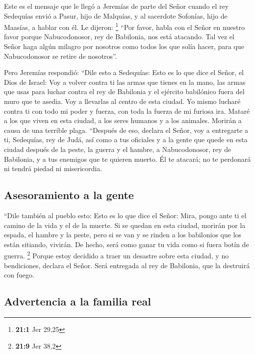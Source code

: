  Este es el mensaje que le llegó a Jeremías de parte del
Señor cuando el rey Sedequías envió a Pasur, hijo de Malquías, y al
sacerdote Sofonías, hijo de Maasías, a hablar con él. Le dijeron:
\footnote{\textbf{21:1} Jer 29,25}  ``Por favor, habla con
el Señor en nuestro favor porque Nabucodonosor, rey de Babilonia, nos
está atacando. Tal vez el Señor haga algún milagro por nosotros como
todos los que solía hacer, para que Nabucodonosor se retire de
nosotros''.

 Pero Jeremías respondió: ``Dile esto a Sedequías:
 Esto es lo que dice el Señor, el Dios de Israel: Voy a
volver contra ti las armas que tienes en la mano, las armas que usas
para luchar contra el rey de Babilonia y el ejército babilónico fuera
del muro que te asedia. Voy a llevarlas al centro de esta ciudad.
 Yo mismo lucharé contra ti con todo mi poder y fuerza,
con toda la fuerza de mi furiosa ira.  Mataré a los que
viven en esta ciudad, a los seres humanos y a los animales. Morirán a
causa de una terrible plaga.  ``Después de eso, declara el
Señor, voy a entregarte a ti, Sedequías, rey de Judá, así como a tus
oficiales y a la gente que quede en esta ciudad después de la peste, la
guerra y el hambre, a Nabucodonosor, rey de Babilonia, y a tus enemigos
que te quieren muerto. Él te atacará; no te perdonará ni tendrá piedad
ni misericordia.

\hypertarget{asesoramiento-a-la-gente}{%
\subsection{Asesoramiento a la gente}\label{asesoramiento-a-la-gente}}

 ``Dile también al pueblo esto: Esto es lo que dice el
Señor: Mira, pongo ante ti el camino de la vida y el de la muerte.
 Si se quedan en esta ciudad, morirán por la espada, el
hambre y la peste, pero si se van y se rinden a los babilonios que los
están sitiando, vivirán. De hecho, será como ganar tu vida como si fuera
botín de guerra. \footnote{\textbf{21:9} Jer 38,2} 
Porque estoy decidido a traer un desastre sobre esta ciudad, y no
bendiciones, declara el Señor. Será entregada al rey de Babilonia, que
la destruirá con fuego.

\hypertarget{advertencia-a-la-familia-real}{%
\subsection{Advertencia a la familia
real}\label{advertencia-a-la-familia-real}}

